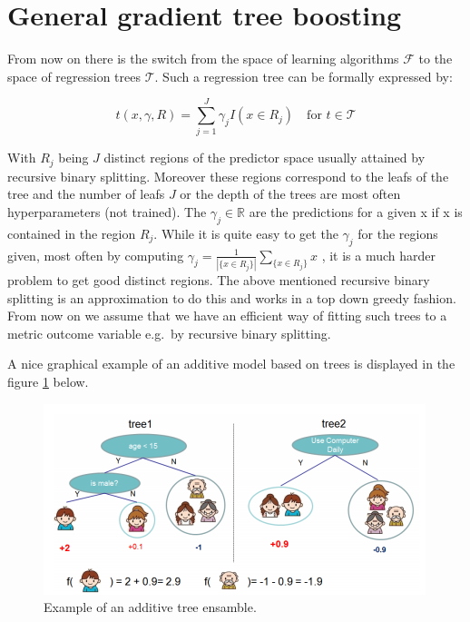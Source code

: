 \documentclass[
]{book}
\begin{document}
\hypertarget{general-gradient-tree-boosting}{%
\section{General gradient tree boosting}\label{general-gradient-tree-boosting}}

From now on there is the switch from the space of learning algorithms \(\mathcal{F}\) to the space of regression trees \(\mathcal{T}\). Such a regression tree can be formally expressed by:

\begin{equation}
  t(x, \gamma, R) = \sum_{j=1}^J \gamma_j I(x \in R_j) \quad \text{for  } t \in \mathcal{T}
  \label{eq:treeDef}
\end{equation}

With \(R_j\) being \(J\) distinct regions of the predictor space usually attained by recursive binary splitting. Moreover these regions correspond to the leafs of the tree and the number of leafs \(J\) or the depth of the trees are most often hyperparameters (not trained). The \(\gamma_j \in \mathbb{R}\) are the predictions for a given x if x is contained in the region \(R_j\). While it is quite easy to get the \(\gamma_j\) for the regions given, most often by computing \(\gamma_j = \frac{1}{|\{x \in R_j\}|} \sum_{\{x \in R_j\}} x\) , it is a much harder problem to get good distinct regions. The above mentioned recursive binary splitting is an approximation to do this and works in a top down greedy fashion.\citep{elements} From now on we assume that we have an efficient way of fitting such trees to a metric outcome variable e.g.~by recursive binary splitting.

A nice graphical example of an additive model based on trees is displayed in the figure \ref{fig:exampleAdditiveTree} below.\citep{xgboostPaper}

\begin{figure}

{\centering \includegraphics[width=0.7\linewidth]{_pictures/boosting_easy} 

}

\caption{Example of an additive tree ensamble.}\label{fig:exampleAdditiveTree}
\end{figure}
\end{document}
